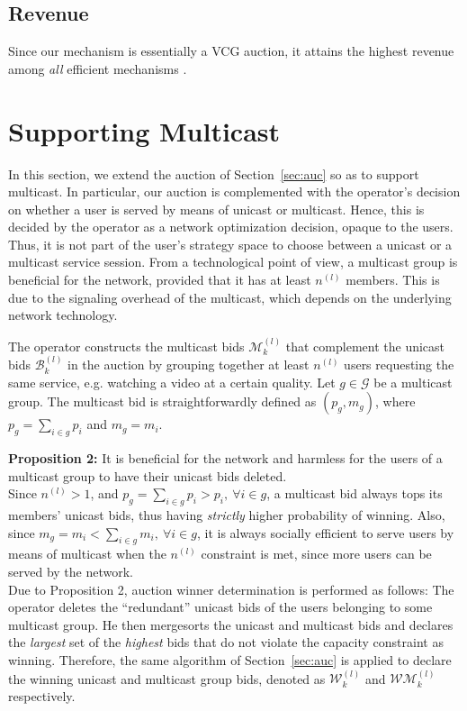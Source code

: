 \documentclass[a4paper]{article}
\begin{document}
\subsection{Revenue} 
Since our mechanism is essentially a VCG auction, it attains 
the highest revenue among {\em all}
efficient mechanisms \cite{krishna}. 

\section{Supporting Multicast}\label{sec:mc}

In this section, we extend the auction of Section~\ref{sec:auc} so as
to support multicast. In particular, our auction is complemented
with the operator's decision on whether a user is served by means of  
unicast or multicast. Hence, this is decided by the operator 
as a network optimization decision, opaque to the users.
Thus, it is not part of the
user's strategy space to choose between a unicast or a multicast service session.
From a technological point of view, a
multicast group is beneficial for the network, provided that it has 
at least $n^{(l)}$ members. This is due to the signaling overhead of the 
multicast, which depends on the underlying network technology. 

The operator constructs the multicast bids $\mathcal{M}_k^{(l)}$ that
complement the unicast bids $\mathcal{B}_k^{(l)}$ in the auction
by grouping together at least $n^{(l)}$ users requesting the same 
service, e.g. watching a video at a certain quality. Let $g \in \mathcal{G}$ be a 
multicast group. 
The multicast bid is straightforwardly defined as $(p_g, m_g)$,  
where $p_g = \sum_{i \in g}{p_i}$ and $m_g = m_i$. 


{\bf Proposition 2:} It is beneficial for the network and harmless for the 
users of a multicast group to have their unicast bids deleted.
\\
Since $n^{(l)} > 1$, and $p_g = \sum_{i \in g}{p_i} > p_i, \   \forall i \in g$,
a multicast bid always tops its members' unicast bids, thus having 
{\em strictly} higher probability of winning.
Also, since $m_g = m_i < \sum_{i \in g}{m_i}, \   \forall i \in g$,
it is always socially efficient to serve users by means of multicast when
the $n^{(l)}$ constraint is met,
since more users can be served by the network.
\\

Due to Proposition 2, auction winner determination is performed as follows:
The operator deletes the ``redundant'' unicast bids of the users belonging
to some multicast group. He then mergesorts the unicast and multicast bids and 
declares the {\em largest} set of the {\em highest} bids  
that do not violate the capacity constraint as winning. Therefore, the
same algorithm of Section~\ref{sec:auc} is applied to declare the winning
unicast and multicast group bids, denoted as $\mathcal{W}_k^{(l)}$ and 
$\mathcal{WM}_k^{(l)}$ respectively. 
\end{document}
